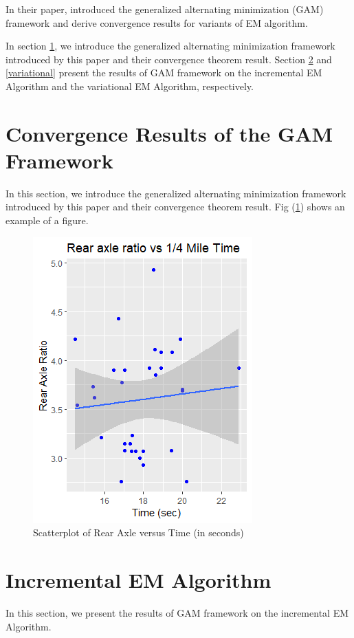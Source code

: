 \documentclass[11pt]{article}
\begin{document}
	In their paper, \cite{gunawardana2005convergence} introduced the generalized alternating minimization (GAM) framework and derive convergence results for variants of EM algorithm.
	
	In section \ref{gam}, we introduce the generalized alternating  minimization framework introduced by this paper and their convergence theorem result. Section \ref{incremental} and \ref{variational} present the results of GAM framework on the incremental EM Algorithm and the variational EM Algorithm, respectively.
	
	\section{Convergence Results of the GAM Framework} \label{gam}
	In this section, we introduce the generalized alternating  minimization framework introduced by this paper and their convergence theorem result.
	Fig (\ref{fig:examplefig}) shows an example of a figure.
	
	\begin{figure}[!ht]
		\label{fig:examplefig}
		\centering
		\includegraphics{examplefig.png}
		\caption{Scatterplot of Rear Axle versus Time (in seconds)}
	\end{figure}
	
	\section{Incremental EM Algorithm} \label{incremental}
	In this section, we present the results of GAM framework on the incremental EM Algorithm. 
\end{document}
